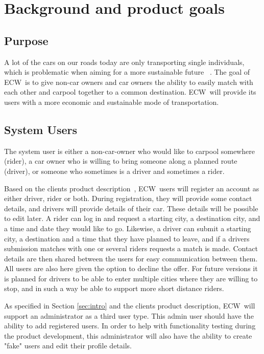 \documentclass{article}
\newcommand{\name}{ECW\ }
\begin{document}
\section{Background and product goals}
\subsection{Purpose}
A lot of the cars on our roads today are only transporting single individuals, which is problematic when aiming for a more sustainable future ~\cite{BNL}. The goal of \name is to give non-car owners and car owners the ability to easily match with each other and carpool together to a common destination. \name will provide its users with a more economic and sustainable mode of transportation.

\subsection{System Users}
The system user is either a non-car-owner who would like to carpool somewhere (rider), a car owner who is willing to bring someone along a planned route (driver), or someone who sometimes is a driver and sometimes a rider.

Based on the clients product description~\cite{PH}, \name users will register an account as either driver, rider or both. During registration, they will provide some contact details, and drivers will provide details of their car. These details will be possible to edit later. A rider can log in and request a starting city, a destination city, and a time and date they would like to go. Likewise, a driver can submit a starting city, a destination and a time that they have planned to leave, and if a drivers submission matches with one or several riders requests a match is made. Contact details are then shared between the users for easy communication between them. All users are also here given the option to decline the offer. For future versions it is planned for drivers to be able to enter multiple cities where they are willing to stop, and in such a way be able to support more short distance riders.

As specified in Section \ref{sec:intro} and the clients product description\cite{PH}, \name will support an administrator as a third user type. This admin user should have the ability to add registered users. In order to help with functionality testing during the product development, this administrator will also have the ability to create "fake" users and edit their profile details.
\end{document}
